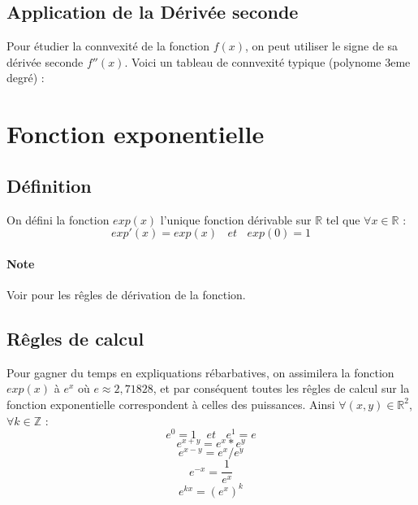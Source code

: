 \documentclass{report}
\begin{document}
    \subsection{Application de la Dérivée seconde}

    Pour étudier la connvexité de la fonction \( f(x) \), on peut utiliser le signe de sa dérivée seconde \( f''(x) \). Voici un tableau de connvexité typique (polynome 3eme degré) :

    \begin{center}
    \end{center}

    \newpage

    \section{Fonction exponentielle}
    \subsection{Définition}
    On défini la fonction $exp(x)$ l'unique fonction dérivable sur $\mathbb{R}$ tel que $\forall x \in \mathbb{R}$ : \[exp'(x) = exp(x) ~~~~et~~~~ exp(0)=1\]

    \paragraph{Note} Voir  pour les rêgles de dérivation de la fonction.

    \subsection{Rêgles de calcul}
    Pour gagner du temps en expliquations rébarbatives, on assimilera la fonction $exp(x)$ à $e^x$ où $e \approx 2,71828$, et par conséquent toutes les rêgles de calcul sur la fonction exponentielle correspondent à celles des puissances. 
    Ainsi $\forall (x,y) \in \mathbb{R}^2$, $\forall k \in \mathbb{Z}$ : 
    \[e^0=1 ~~~~et~~~~ e^1=e\]
    \[e^{x+y}=e^{x}*e^{y}\]
    \[e^{x-y}=e^{x} / e^{y}\]
    \[e^{-x}=\frac{1}{e^x}\]
    \[e^{kx}=(e^{x})^k\]
\end{document}
